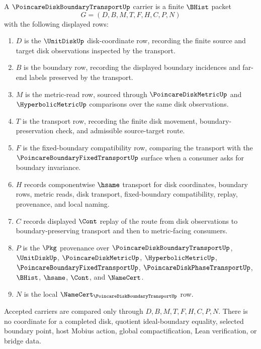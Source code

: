 \begin{definition}
\label{def:poincare-disk-boundary-transport-carrier}
A $\PoincareDiskBoundaryTransportUp$ carrier is a finite $\BHist$ packet
$$
G=(D,B,M,T,F,H,C,P,N)
$$
with the following displayed rows:
\begin{enumerate}
\item $D$ is the $\UnitDiskUp$ disk-coordinate row, recording the finite source and target disk observations inspected by the transport.
\item $B$ is the boundary row, recording the displayed boundary incidences and far-end labels preserved by the transport.
\item $M$ is the metric-read row, sourced through $\PoincareDiskMetricUp$ and $\HyperbolicMetricUp$ comparisons over the same disk observations.
\item $T$ is the transport row, recording the finite disk movement, boundary-preservation check, and admissible source-target route.
\item $F$ is the fixed-boundary compatibility row, comparing the transport with the $\PoincareBoundaryFixedTransportUp$ surface when a consumer asks for boundary invariance.
\item $H$ records componentwise $\hsame$ transport for disk coordinates, boundary rows, metric reads, disk transport, fixed-boundary compatibility, replay, provenance, and local naming.
\item $C$ records displayed $\Cont$ replay of the route from disk observations to boundary-preserving transport and then to metric-facing consumers.
\item $P$ is the $\Pkg$ provenance over $\PoincareDiskBoundaryTransportUp$, $\UnitDiskUp$, $\PoincareDiskMetricUp$, $\HyperbolicMetricUp$, $\PoincareBoundaryFixedTransportUp$, $\PoincareDiskPhaseTransportUp$, $\BHist$, $\hsame$, $\Cont$, and $\NameCert$.
\item $N$ is the local $\NameCert_{\PoincareDiskBoundaryTransportUp}$ row.
\end{enumerate}
Accepted carriers are compared only through $D,B,M,T,F,H,C,P,N$. There is no coordinate for a completed disk, quotient ideal-boundary equality, selected boundary point, host Mobius action, global compactification, Lean verification, or bridge data.
\end{definition}

